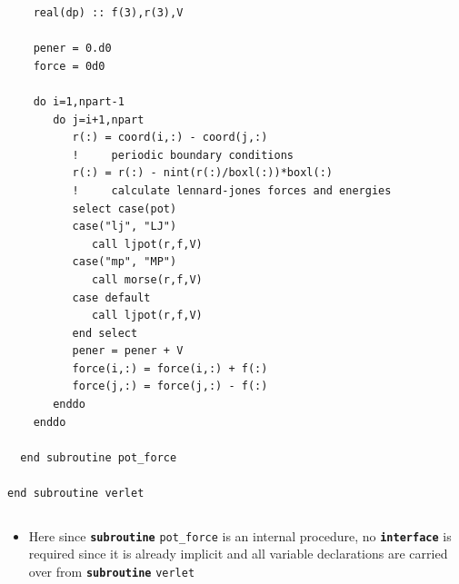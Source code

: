 \documentclass[slidestop,mathserif,compress,xcolor=svgnames]{beamer}
\newcommand{\bftt}[1]{\textbf{\texttt{#1}}}
\newenvironment{eeblock}[0]
{
\begin{beamerboxesrounded}[upper=uppercol4,lower=lowercol4,shadow=true]}
{\end{beamerboxesrounded}}
\begin{document}
\begin{frame}
{\begin{columns}
\begin{eeblock}{}
\begin{verbatim}
    real(dp) :: f(3),r(3),V
    
    pener = 0.d0
    force = 0d0
    
    do i=1,npart-1
       do j=i+1,npart
          r(:) = coord(i,:) - coord(j,:)
          !     periodic boundary conditions
          r(:) = r(:) - nint(r(:)/boxl(:))*boxl(:)
          !     calculate lennard-jones forces and energies
          select case(pot)
          case("lj", "LJ")
             call ljpot(r,f,V)
          case("mp", "MP")
             call morse(r,f,V)
          case default
             call ljpot(r,f,V)
          end select
          pener = pener + V
          force(i,:) = force(i,:) + f(:)
          force(j,:) = force(j,:) - f(:)
       enddo
    enddo
    
  end subroutine pot_force
  
end subroutine verlet
        \end{verbatim}
      \end{eeblock}
    \end{columns}
  }
  \begin{itemize}
    \item Here since \bftt{subroutine} \texttt{pot\_force} is an internal procedure, no \bftt{interface} is required since it is already implicit and all variable declarations are carried over from \bftt{subroutine} \texttt{verlet}
  \end{itemize}
\end{frame}
\end{document}
